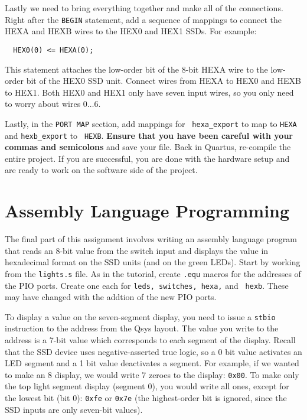 \documentclass[10pt]{article}
\begin{document}
 Lastly we need to bring everything together and
make all of the connections. Right after the {\tt BEGIN} statement,
add a sequence of mappings to connect the HEXA and HEXB wires to the
HEX0 and HEX1 SSDs. For example:

\begin{verbatim}
  HEX0(0) <= HEXA(0);
\end{verbatim}

This statement attaches the low-order bit of the 8-bit HEXA wire to
the low-order bit of the HEX0 SSD unit. Connect wires from HEXA to
HEX0 and HEXB to HEX1. Both HEX0 and HEX1 only have seven input wires,
so you only need to worry about wires $0\ldots6$.

Lastly, in the {\tt PORT MAP} section, add mappings for {\tt
  hexa\_export} to map to {\tt HEXA} and {\tt hexb\_export} to {\tt
  HEXB}. {\bf Ensure that you have been careful with your commas and
semicolons} and save your file. Back in Quartus, re-compile the entire
project. If you are successful, you are done with the hardware setup
and are ready to work on the software side of the project.

\section{Assembly Language Programming}

The final part of this assignment involves writing an assembly
language program that reads an 8-bit value from the switch input and
displays the value in hexadecimal format on the SSD units (and on the
green LEDs). Start by working from the {\tt lights.s} file. As in the
tutorial, create {\tt .equ} macros for the addresses of the PIO
ports. Create one each for {\tt leds, switches, hexa,} and {\tt
  hexb}. These may have changed with the addtion of the new PIO ports.

To display a value on the seven-segment display, you need to issue a
{\tt stbio} instruction to the address from the Qsys layout. The value
you write to the address is a 7-bit value which corresponds to each
segment of the display. Recall that the SSD device uses
negative-asserted true logic, so a 0 bit value activates an LED
segment and a 1 bit value deactivates a segment. For example, if we
wanted to make an 8 display, we would write 7 zeroes to the
display: {\tt 0x00}. To make only the top light segment display
(segment 0), you would write all ones, except for the lowest bit (bit
0): {\tt 0xfe} or {\tt 0x7e} (the highest-order bit is ignored, since
the SSD inputs are only seven-bit values).\\
\end{document}
